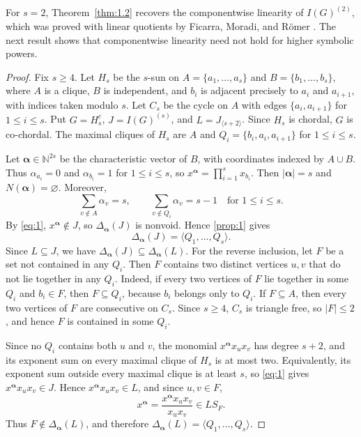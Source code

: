 \documentclass[11pt]{amsart}
\newtheorem{proposition}[theorem]{Proposition}
\theoremstyle{definition}
\newcommand{\NN}{\mathbb N}
\begin{document}
For $s=2$, Theorem~\ref{thm:1.2} recovers the componentwise linearity of $I(G)^{(2)}$, which was proved with linear quotients by Ficarra, Moradi, and R\"omer \cite[Theorem~3.5]{FMR}. The next result shows that componentwise linearity need not hold for higher symbolic powers.

\begin{proof}
Fix $s\ge4$. Let $H_s$ be the $s$-sun on $A=\{a_1,\ldots,a_s\}$ and $B=\{b_1,\ldots,b_s\}$, where $A$ is a clique, $B$ is independent, and $b_i$ is adjacent precisely to $a_i$ and $a_{i+1}$, with indices taken modulo $s$. Let $C_s$ be the cycle on $A$ with edges $\{a_i,a_{i+1}\}$ for $1\le i\le s$. Put $G=H_s^c$, $J=I(G)^{(s)}$, and $L=J_{\langle s+2\rangle}$. Since $H_s$ is chordal, $G$ is co-chordal. The maximal cliques of $H_s$ are $A$ and $Q_i=\{b_i,a_i,a_{i+1}\}$ for $1\le i\le s$.

Let $\boldsymbol{\alpha}\in\NN^{2s}$ be the characteristic vector of $B$, with coordinates indexed by $A\cup B$. Thus $\alpha_{a_i}=0$ and $\alpha_{b_i}=1$ for $1\le i\le s$, so $x^{\boldsymbol{\alpha}}=\prod_{i=1}^s x_{b_i}$. Then $|\boldsymbol{\alpha}|=s$ and $N(\boldsymbol{\alpha})=\varnothing$. Moreover,
\[
\sum_{v\notin A}\alpha_v=s,
\qquad
\sum_{v\notin Q_i}\alpha_v=s-1
\quad\text{for }1\le i\le s.
\]
By \cref{eq:1}, $x^{\boldsymbol{\alpha}}\notin J$, so $\Delta_{\boldsymbol{\alpha}}(J)$ is nonvoid. Hence \cref{prop:1} gives
\[
\Delta_{\boldsymbol{\alpha}}(J)=\langle Q_1,\ldots,Q_s\rangle.
\]
Since $L\subseteq J$, we have $\Delta_{\boldsymbol{\alpha}}(J)\subseteq\Delta_{\boldsymbol{\alpha}}(L)$. For the reverse inclusion, let $F$ be a set not contained in any $Q_i$. Then $F$ contains two distinct vertices $u,v$ that do not lie together in any $Q_i$. Indeed, if every two vertices of $F$ lie together in some $Q_i$ and $b_i\in F$, then $F\subseteq Q_i$, because $b_i$ belongs only to $Q_i$. If $F\subseteq A$, then every two vertices of $F$ are consecutive on $C_s$. Since $s\ge4$, $C_s$ is triangle free, so $|F|\le2$, and hence $F$ is contained in some $Q_i$.

Since no $Q_i$ contains both $u$ and $v$, the monomial $x^{\boldsymbol{\alpha}}x_ux_v$ has degree $s+2$, and its exponent sum on every maximal clique of $H_s$ is at most two. Equivalently, its exponent sum outside every maximal clique is at least $s$, so \cref{eq:1} gives $x^{\boldsymbol{\alpha}}x_ux_v\in J$. Hence $x^{\boldsymbol{\alpha}}x_ux_v\in L$, and since $u,v\in F$,
\[
x^{\boldsymbol{\alpha}}
=\frac{x^{\boldsymbol{\alpha}}x_ux_v}{x_ux_v}
\in LS_F.
\]
Thus $F\notin\Delta_{\boldsymbol{\alpha}}(L)$, and therefore $\Delta_{\boldsymbol{\alpha}}(L)=\langle Q_1,\ldots,Q_s\rangle$.


\end{proof}
\end{document}
